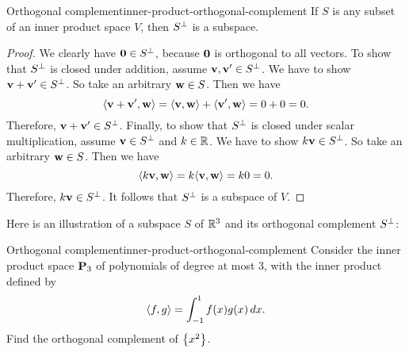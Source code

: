 \begin{proposition}{Orthogonal complement}{inner-product-orthogonal-complement}
  If $S$ is any subset of an inner product space $V$, then $S^{\perp}$
  is a subspace.
\end{proposition}

\begin{proof}
  We clearly have $\vect{0}\in S^{\orth}$, because $\vect{0}$ is
  orthogonal to all vectors. To show that $S^{\perp}$ is closed under
  addition, assume $\vect{v}, \vect{v}'\in S^{\orth}$. We have to show
  $\vect{v}+\vect{v}'\in S^{\orth}$. So take an arbitrary $\vect{w}\in
  S$. Then we have
  \begin{equation*}
    \iprod{\vect{v}+\vect{v}',\vect{w}}
    = \iprod{\vect{v},\vect{w}} + \iprod{\vect{v}',\vect{w}}
    = 0 + 0 = 0.
  \end{equation*}
  Therefore, $\vect{v}+\vect{v}'\in S^{\orth}$. Finally, to show that
  $S^{\perp}$ is closed under scalar multiplication, assume
  $\vect{v}\in S^{\orth}$ and $k\in\mathbb{R}$. We have to show
  $k\vect{v}\in S^{\orth}$. So take an arbitrary
  $\vect{w}\in S$. Then we have
  \begin{equation*}
    \iprod{k\vect{v},\vect{w}}
    = k\iprod{\vect{v},\vect{w}}
    = k0 = 0.
  \end{equation*}
  Therefore, $k\vect{v}\in S^{\orth}$. It follows that $S^{\perp}$ is
  a subspace of $V$.
\end{proof}

Here is an illustration of a subspace $S$ of $\mathbb{R}^3$ and its orthogonal
complement $S^{\perp}$:

\begin{center}
\end{center}

\begin{example}{Orthogonal complement}{inner-product-orthogonal-complement}
  Consider the inner product space $\mathbf{P}_3$ of polynomials of degree
  at most $3$, with the inner product defined by
  \begin{equation*}
    \langle f,g\rangle = \int_{-1}^{1} f(x)g(x)\,dx.
  \end{equation*}
  Find the orthogonal complement of $\left\{x^2\right\}$.
\end{example}


